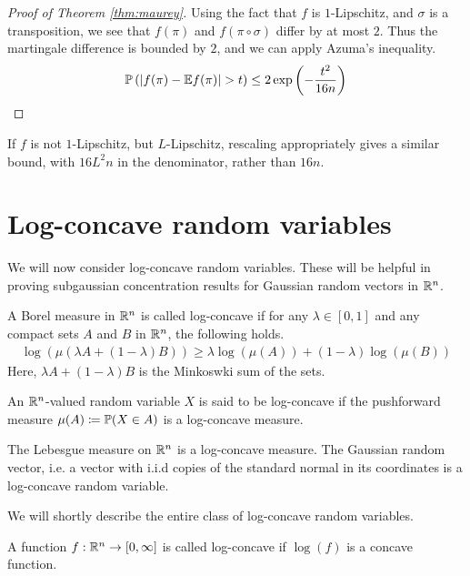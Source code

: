 \documentclass[11pt]{article}
\begin{document}
\begin{proof}[Proof of Theorem \ref{thm:maurey}]
  Using the fact that $f$ is $1$-Lipschitz, and $\sigma$ is a transposition, we see that $f(\pi)$ and $f(\pi \circ \sigma)$ differ by at most $2$.
  Thus the martingale difference is bounded by $2$, and we can apply Azuma's inequality.
  \begin{align*}
    \P\left( \left| f(\pi) - \E f(\pi) \right| > t \right) \leq 2 \exp \left( - \frac{t^2}{16n} \right)
  \end{align*}
\end{proof}
\begin{remark}
  If $f$ is not $1$-Lipschitz, but $L$-Lipschitz, rescaling appropriately gives a similar bound, with $16L^2n$ in the denominator, rather than $16n$.
\end{remark}

\section{Log-concave random variables}
\label{sec:log-concave-random}

We will now consider log-concave random variables. These will be helpful in proving subgaussian concentration results for Gaussian random vectors in $\R^n$.

\begin{definition}
  A Borel measure in $\R^n$ is called log-concave if for any $\lambda \in [0,1]$ and any compact sets $A$ and $B$ in $\R^n$, the following holds.
  \begin{align*}
    \log\left(  \mu\left( \lambda A + (1-\lambda)B \right) \right) \geq
    \lambda \log(\mu(A)) + (1-\lambda) \log(\mu(B))
  \end{align*}
  Here, $\lambda A + (1-\lambda)B$ is the Minkoswki sum of the sets.

  An $\R^n$-valued random variable $X$ is said to be log-concave if the pushforward measure $\mu(A) \coloneqq \P(X \in A)$ is a log-concave measure.
\end{definition}
\begin{example}
  The Lebesgue measure on $\R^n$ is a log-concave measure.
  The Gaussian random vector, i.e. a vector with i.i.d copies of the standard normal in its coordinates is a log-concave random variable.
\end{example}
We will shortly describe the entire class of log-concave random variables.
\begin{definition}
  A function $f: \R^n \to [0, \infty]$ is called log-concave if $\log(f)$ is a concave function.
\end{definition}
\end{document}
